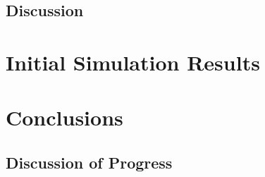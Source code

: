 \documentclass[a4paper,12pt]{report}
\begin{document}
\section{Discussion}

\chapter{Initial Simulation Results}


\chapter{Conclusions}
\section{Discussion of Progress}
\end{document}

